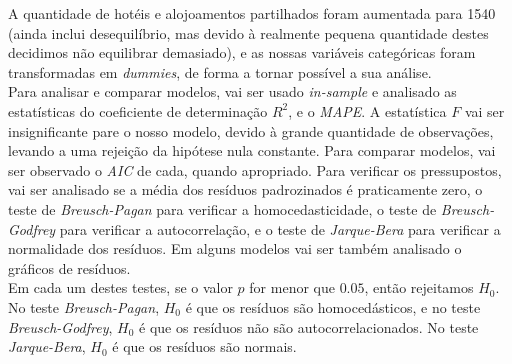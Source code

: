 \documentclass[justified, 11pt]{scrartcl}\usepackage[]{graphicx}\usepackage[]{xcolor}
\begin{document}
A quantidade de hotéis e alojoamentos partilhados foram aumentada para 1540 (ainda inclui desequilíbrio, mas devido à realmente pequena quantidade destes decidimos não equilibrar demasiado), e as nossas variáveis categóricas foram transformadas em \textit{dummies}, de forma a tornar possível a sua análise.\\

Para analisar e comparar modelos, vai ser usado \textit{in-sample} e analisado as estatísticas do coeficiente de determinação $R^2$, e o \textit{MAPE}. A estatística $F$ vai ser insignificante pare o nosso modelo, devido à grande quantidade de observações, levando a uma rejeição da hipótese nula constante. Para comparar modelos, vai ser observado o \textit{AIC} de cada, quando apropriado. Para verificar os pressupostos, vai ser analisado se a média dos resíduos padrozinados é praticamente zero, o teste de \textit{Breusch-Pagan} para verificar a homocedasticidade, o teste de \textit{Breusch-Godfrey} para verificar a autocorrelação, e o teste de \textit{Jarque-Bera} para verificar a normalidade dos resíduos. Em alguns modelos vai ser também analisado o gráficos de resíduos.\\

Em cada um destes testes, se o valor $p$ for menor que $0.05$, então rejeitamos $H_0$. No teste \textit{Breusch-Pagan}, $H_0$ é que os resíduos são homocedásticos, e no teste \textit{Breusch-Godfrey}, $H_0$ é que os resíduos não são autocorrelacionados. No teste \textit{Jarque-Bera}, $H_0$ é que os resíduos são normais.\\
\end{document}
